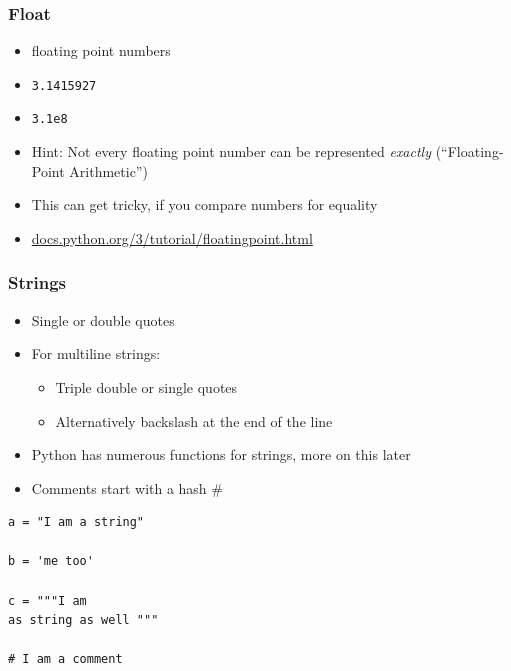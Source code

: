 \documentclass[ngerman]{beamer}
\begin{document}
\begin{frame}
\frametitle{Float}

\begin{itemize}
	\item floating point numbers
	\item \texttt{3.1415927}
	\item \texttt{3.1e8}
	\item Hint: Not every floating point number can be represented \textit{exactly} (\enquote{Floating-Point Arithmetic}) 
	\item This can get tricky, if you compare numbers for equality
	\item \url{docs.python.org/3/tutorial/floatingpoint.html}

\end{itemize}
\end{frame}

\begin{frame}[containsverbatim]
\frametitle{Strings}

\begin{itemize}
\item Single or double quotes
\item For multiline strings:

\begin{itemize}
	\item Triple double or single quotes
	\item Alternatively backslash at the end of the line 
\end{itemize}

\item Python has numerous functions for strings, more on this later
\item Comments start with a hash \#
\end{itemize}


\begin{lstlisting}[style=Python]
a = "I am a string"

b = 'me too'

c = """I am 
as string as well """

# I am a comment
\end{lstlisting}


\end{frame}
\end{document}

